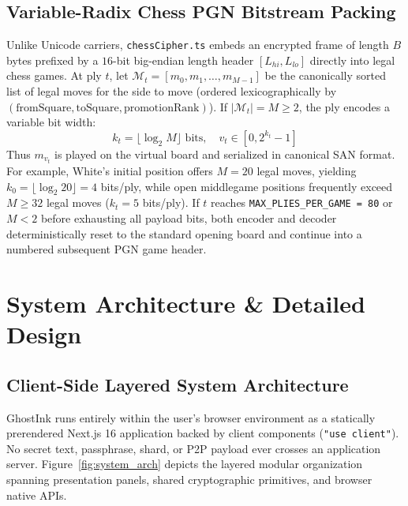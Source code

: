 \documentclass[12pt,a4paper,oneside,openany]{report}
\begin{document}
\section{Variable-Radix Chess PGN Bitstream Packing}
Unlike Unicode carriers, \texttt{chessCipher.ts} embeds an encrypted frame of length $B$ bytes prefixed by a $16$-bit big-endian length header $[L_{hi}, L_{lo}]$ directly into legal chess games. At ply $t$, let $\mathcal{M}_t = [m_0, m_1, \dots, m_{M-1}]$ be the canonically sorted list of legal moves for the side to move (ordered lexicographically by $(\text{fromSquare}, \text{toSquare}, \text{promotionRank})$). If $|\mathcal{M}_t| = M \ge 2$, the ply encodes a variable bit width:
\begin{equation}
    k_t = \lfloor \log_2 M \rfloor \text{ bits}, \quad v_t \in [0, 2^{k_t} - 1]
\end{equation}
Thus $m_{v_t}$ is played on the virtual board and serialized in canonical SAN format. For example, White's initial position offers $M = 20$ legal moves, yielding $k_0 = \lfloor \log_2 20 \rfloor = 4$ bits/ply, while open middlegame positions frequently exceed $M \ge 32$ legal moves ($k_t = 5$ bits/ply). If $t$ reaches \texttt{MAX\_PLIES\_PER\_GAME = 80} or $M < 2$ before exhausting all payload bits, both encoder and decoder deterministically reset to the standard opening board and continue into a numbered subsequent PGN game header.

\chapter{System Architecture \& Detailed Design}

\section{Client-Side Layered System Architecture}
GhostInk runs entirely within the user's browser environment as a statically prerendered Next.js 16 application backed by client components (\texttt{"use client"}). No secret text, passphrase, shard, or P2P payload ever crosses an application server. Figure~\ref{fig:system_arch} depicts the layered modular organization spanning presentation panels, shared cryptographic primitives, and browser native APIs.
\end{document}
